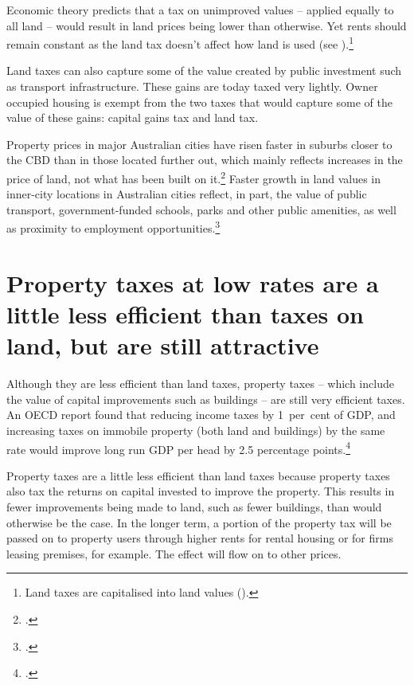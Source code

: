 \documentclass[twoside,english]{palatinob5portrait}
\begin{document}
Economic theory predicts that a tax on unimproved values – applied equally to all land – would result in land prices being lower than otherwise. Yet rents should remain constant as the land tax doesn’t affect how land is used (see ).\footnote{Land taxes are capitalised into land values (\textcite[][247--248]{HenryTaxReview2010}).}   

Land taxes can also capture some of the value created by public investment such as transport infrastructure. These gains are today taxed very lightly. Owner occupied housing is exempt from the two taxes that would capture some of the value of these gains: capital gains tax and land tax. 

Property prices in major Australian cities have risen faster in suburbs closer to the CBD than in those located further out, which mainly reflects increases in the price of land, not what has been built on it.\footcite[][22]{KulishRichardsGillitzer2011}  Faster growth in land values in inner-city locations in Australian cities reflect, in part, the value of public transport, government-funded schools, parks and other public amenities, as well as proximity to employment opportunities.\footcite[][87]{KellyDonegan2015}

\section{Property taxes at low rates are a little less efficient than taxes on land, but are still attractive\label{sec:PROP-4-2}}
Although they are less efficient than land taxes, property taxes -- which include the value of capital improvements such as buildings -- are still very efficient taxes. An OECD report found that reducing income taxes by 1~per~cent of GDP, and increasing taxes on immobile property (both land and buildings) by the same rate would improve long run GDP per head by 2.5 percentage points.\footcite[][58]{JohanssonHeadyArnoldEtAl2008}

Property taxes are a little less efficient than land taxes because property taxes also tax the returns on capital invested to improve the property. This results in fewer improvements being made to land, such as fewer buildings, than would otherwise be the case. In the longer term, a portion of the property tax will be passed on to property users through higher rents for rental housing or for firms leasing premises, for example. The effect will flow on to other prices.
\end{document}
